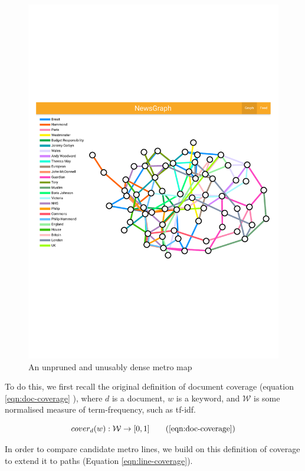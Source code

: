 \begin{figure}[htbp!]
	\centering
	\includegraphics[width=\textwidth]{img/implementation/datascienceishard.pdf}
	\caption{An unpruned and unusably dense metro map}
	\label{fig:dense}
\end{figure}

To do this, we first recall the original definition of document coverage (equation \ref{eqn:doc-coverage} \citep{GeneratingInformationMaps, MetroMapsOfScience, InformationCartographyPre}), where $d$ is a document, $w$ is a keyword, and $\mathcal{W}$ is some normalised measure of term-frequency, such as tf-idf.

\begin{equation}
	cover_{d}(w) : \mathcal{W} \rightarrow [0,1]
	\tag{\ref{eqn:doc-coverage}}
\end{equation}

In order to compare candidate metro lines, we build on this definition of coverage to extend it to paths (Equation \ref{eqn:line-coverage}).

